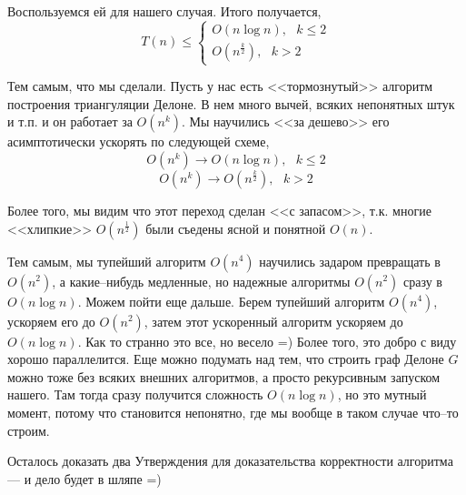 \documentclass{article}
\begin{document}
	Воспользуемся ей для нашего случая. Итого получается, 
	$$
	    T(n) \le \left\{
            	\begin{array}{c}
				O(n \log n), ~~~ k \le 2	\\
				O(n^\frac{k}{2}), ~~~ k > 2
			\end{array}
		\right.	
    $$
    
    Тем самым, что мы сделали. Пусть у нас есть <<тормознутый>> алгоритм построения триангуляции Делоне. В нем много вычей, всяких непонятных штук и т.п. и он работает за $O(n^k)$. Мы научились <<за дешево>> его асимптотически ускорять по следующей схеме,
    $$
        O(n^k) \rightarrow O(n \log n), ~~~ k \le 2
    $$
    $$
        O(n^k) \rightarrow O(n^\frac{k}{2}), ~~~ k > 2
    $$
    
    Более того, мы видим что этот переход сделан <<с запасом>>, т.к. многие <<хлипкие>> $O(n^\frac{1}{2})$ были съедены ясной и понятной $O(n)$. 
    
    Тем самым, мы тупейший алгоритм $O(n^4)$ научились задаром превращать в $O(n^2)$, а какие--нибудь медленные, но надежные алгоритмы $O(n^2)$ сразу в $O(n \log n)$. Можем пойти еще дальше. Берем тупейший алгоритм $O(n^4)$, ускоряем его до $O(n^2)$, затем этот ускоренный алгоритм ускоряем до $O(n \log n)$. Как то странно это все, но весело =) Более того, это добро с виду хорошо параллелится. Еще можно подумать над тем, что строить граф Делоне $G$ можно тоже без всяких внешних алгоритмов, а просто рекурсивным запуском нашего. Там тогда сразу получится сложность $O(n \log n)$, но это мутный момент, потому что становится непонятно, где мы вообще в таком случае что--то строим.
    
     Осталось доказать два Утверждения для доказательства корректности алгоритма --- и дело будет в шляпе =)
	
	
	
\end{document}
